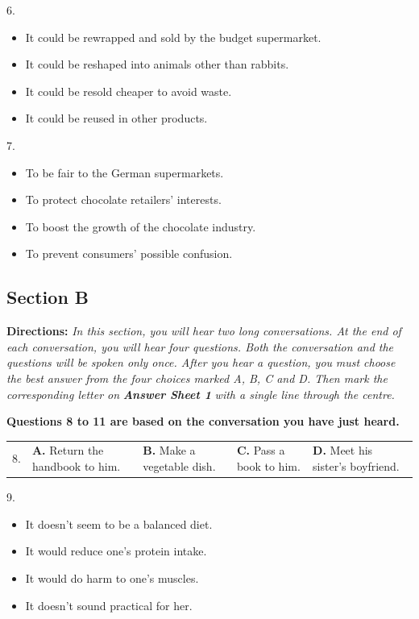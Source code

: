 \documentclass[UTF8,11pt]{ctexart}
\begin{document}
6.


\begin{itemize}[leftmargin=2em,itemsep=.2em,topsep=.4em]\item[A.] It could be rewrapped and sold by the budget supermarket.
\item[B.] It could be reshaped into animals other than rabbits.
\item[C.] It could be resold cheaper to avoid waste.
\item[D.] It could be reused in other products.
\end{itemize}

7.


\begin{itemize}[leftmargin=2em,itemsep=.2em,topsep=.4em]\item[A.] To be fair to the German supermarkets.
\item[B.] To protect chocolate retailers’ interests.
\item[C.] To boost the growth of the chocolate industry.
\item[D.] To prevent consumers’ possible confusion.
\end{itemize}

\subsection*{\textbf{Section B}}


\textbf{Directions:} \textit{In this section, you will hear two long conversations. At the end of each conversation, you will hear} \textit{four questions. Both the conversation and the questions will be spoken only once. After you hear a question, you} \textit{must choose the best answer from the four choices marked A, B, C and D. Then mark the corresponding letter on} \textbf{\textit{Answer Sheet 1}}\textit{ with a single line through the centre.}


\textbf{Questions 8 to 11 are based on the conversation you have just heard.}


\noindent\begin{tabularx}{\linewidth}{@{}lXXXX@{}}8. & \textbf{A.} Return the handbook to him. & \textbf{B.} Make a vegetable dish. & \textbf{C.} Pass a book to him. & \textbf{D.} Meet his sister’s boyfriend.\\\end{tabularx}\par

9.


\begin{itemize}[leftmargin=2em,itemsep=.2em,topsep=.4em]\item[A.] It doesn’t seem to be a balanced diet.
\item[B.] It would reduce one’s protein intake.
\item[C.] It would do harm to one’s muscles.
\item[D.] It doesn’t sound practical for her.
\end{itemize}
\end{document}
